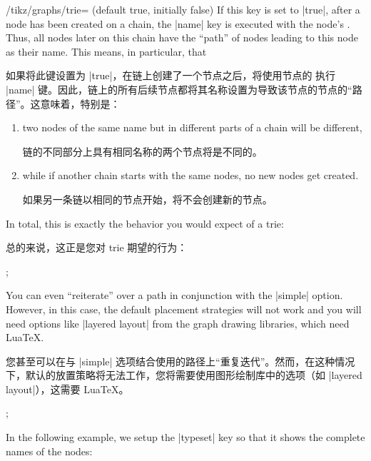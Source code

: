 \begin{key}{/tikz/graphs/trie= (default true, initially false)}
    If this key is set to |true|, after a node has been created on a chain, the
    |name| key is executed with the node's . Thus, all nodes
    later on this chain have the ``path'' of nodes leading to this node as
    their name. This means, in particular, that
    
    如果将此键设置为 |true|，在链上创建了一个节点之后，将使用节点的  执行 |name| 键。因此，链上的所有后续节点都将其名称设置为导致该节点的节点的“路径”。这意味着，特别是：

    \begin{enumerate}
        \item two nodes of the same name but in different parts of a chain will
            be different,

            链的不同部分上具有相同名称的两个节点将是不同的。

        \item while if another chain starts with the same nodes, no new nodes
            get created.

            如果另一条链以相同的节点开始，将不会创建新的节点。
    \end{enumerate}
    In total, this is exactly the behavior you would expect of a trie:
    
    总的来说，这正是您对 trie 期望的行为：
\begin{codeexample}[preamble={\usetikzlibrary{graphs}}]
\tikz {};
\end{codeexample}
    You can even ``reiterate'' over a path in conjunction with the |simple|
    option. However, in this case, the default placement strategies will not
    work and you will need options like |layered layout| from the graph drawing
    libraries, which need Lua\TeX.
    
    您甚至可以在与 |simple| 选项结合使用的路径上“重复迭代”。然而，在这种情况下，默认的放置策略将无法工作，您将需要使用图形绘制库中的选项（如 |layered layout|），这需要 Lua\TeX。

\ifluatex
\begin{codeexample}[preamble={\usetikzlibrary{graphs,graphdrawing}\usegdlibrary{layered}}]
\tikz {};
\end{codeexample}
    In the following example, we setup the |typeset| key so that it shows the
    complete names of the nodes:
    

\end{key}
